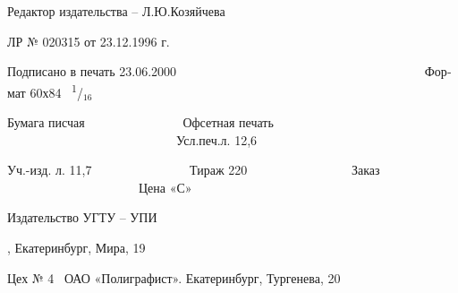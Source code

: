 \documentclass[a4paper]{article}
\newcommand\textsubscript[1]{\ensuremath{{}_{\text{#1}}}}
\begin{document}
\bigskip


\bigskip


\bigskip


\bigskip


\bigskip


\bigskip


\bigskip


\bigskip


\bigskip


\bigskip

{\centering\begin{russian}\sffamily
Редактор издательства – Л.Ю.Козяйчева
\end{russian}\par}


\bigskip


\bigskip


\bigskip


\bigskip

{\centering\begin{russian}\sffamily
ЛР № 020315 от 23.12.1996 г.
\end{russian}\par}


\bigskip

{\begin{russian}\sffamily
Подписано в печать 23.06.2000 \ \ \ \ \ \ \ \ \ \ \ \ \ \ \ \ \ \ \ \ \ \ \ \ \ \ \ \ \ \ \ \ \ \ \ \ \ \ \ Формат 60х84
\ \textsuperscript{1}/\textsubscript{16}
\end{russian}}

{\begin{russian}\sffamily
Бумага писчая \ \ \ \ \ \ \ \ \ \ \ \ \ \ \ Офсетная печать
\ \ \ \ \ \ \ \ \ \ \ \ \ \ \ \ \ \ \ \ \ \ \ \ \ \ \ Усл.печ.л. 12,6 
\end{russian}}

{\begin{russian}\sffamily
Уч.-изд. л. 11,7 \ \ \ \ \ \ \ \ \ \ \ \ \ \ \ Тираж 220 \ \ \ \ \ \ \ \ \ \ \ \ \ \ \ \ Заказ
\ \ \ \ \ \ \ \ \ \ \ \ \ \ \ \ \ \ \ \ \ Цена «С»
\end{russian}}

{\centering\begin{russian}\sffamily
Издательство УГТУ – УПИ
\end{russian}\par}

{\centering\begin{russian}, Екатеринбург, Мира, 19
\end{russian}\par}

{\centering\begin{russian}\sffamily
Цех № 4 \ ОАО «Полиграфист». Екатеринбург, Тургенева, 20
\end{russian}\par}


\bigskip


\bigskip
\end{document}
